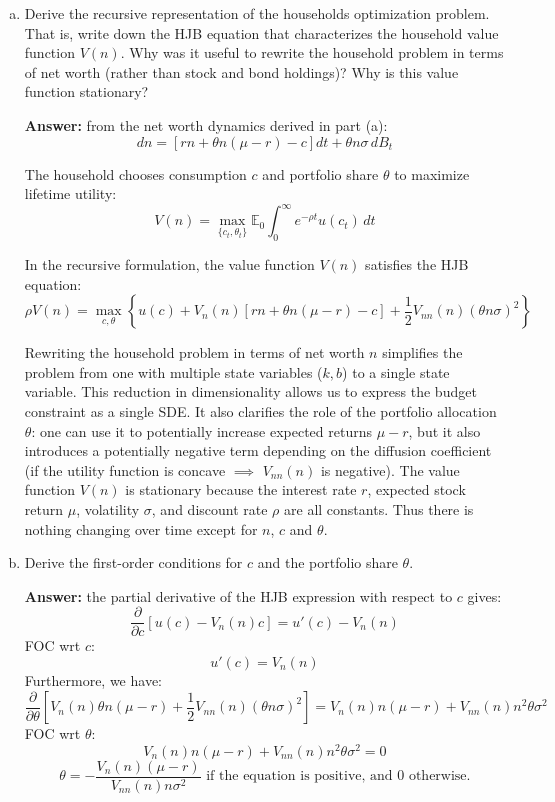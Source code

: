 \documentclass[11pt]{extarticle}
\theoremstyle{plain}
\theoremstyle{definition}
\begin{document}
\begin{enumerate}[(a)]
\item Derive the recursive representation of the households optimization problem. That is, write down the HJB equation that characterizes the household value function $V(n)$. Why was it useful to rewrite the household problem in terms of net worth (rather than stock and bond holdings)? Why is this value function stationary?

\textbf{Answer:} from the net worth dynamics derived in part (a):
\[
dn = \left[ r n + \theta n (\mu - r) - c \right] dt + \theta n \sigma \, dB_t
\]

The household chooses consumption \( c \) and portfolio share \( \theta \) to maximize lifetime utility:
\[
V(n) = \max_{\{ c_t, \theta_t \}} \mathbb{E}_0 \int_0^\infty e^{-\rho t} u(c_t) \, dt
\]

In the recursive formulation, the value function \( V(n) \) satisfies the HJB equation:
\[
\rho V(n) = \max_{c, \theta} \left\{ u(c) + V_n(n) \left[ r n + \theta n (\mu - r) - c \right] + \frac{1}{2} V_{nn}(n) \left( \theta n \sigma \right)^2 \right\}
\]

Rewriting the household problem in terms of net worth \( n \) simplifies the problem from one with multiple state variables (\( k, b \)) to a single state variable. This reduction in dimensionality allows us to express the budget constraint as a single SDE. It also clarifies the role of the portfolio allocation $\theta$: one can use it to potentially increase expected returns $\mu - r$, but it also introduces a potentially negative term depending on the diffusion coefficient (if the utility function is concave $\implies$ $V_{nn}(n)$ is negative). The value function \( V(n) \) is stationary because the interest rate \( r \), expected stock return \( \mu \), volatility \( \sigma \), and discount rate \( \rho \) are all constants. Thus there is nothing changing over time except for $n$, $c$ and $\theta$.

\item Derive the first-order conditions for $c$ and the portfolio share $\theta$.

\textbf{Answer:} the partial derivative of the HJB expression with respect to \( c \) gives:
\[
\frac{\partial}{\partial c} \left[ u(c) - V_n(n) c \right] = u'(c) - V_n(n)
\]
FOC wrt $c$:
\[
u'(c) = V_n(n)
\]
Furthermore, we have:
\[
\frac{\partial}{\partial \theta} \left[ V_n(n) \theta n (\mu - r) + \frac{1}{2} V_{nn}(n) \left( \theta n \sigma \right)^2 \right] = V_n(n) n (\mu - r) + V_{nn}(n) n^2 \theta \sigma^2
\]
FOC wrt $\theta$:
\[
V_n(n) n (\mu - r) + V_{nn}(n) n^2 \theta \sigma^2 = 0
\]
\[
\theta = -\frac{V_n(n) (\mu - r)}{V_{nn}(n) n \sigma^2} \text{ \ if the equation is positive, and 0 otherwise.}
\]


\end{enumerate}
\end{document}
